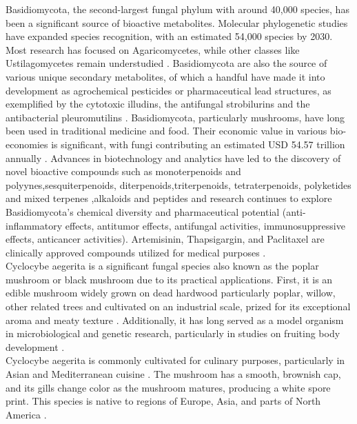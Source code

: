 Basidiomycota, the second-largest fungal phylum with around 40,000 species, has been a significant source of bioactive metabolites. Molecular phylogenetic studies have expanded species recognition, with an estimated 54,000 species by 2030. Most research has focused on Agaricomycetes, while other classes like Ustilagomycetes remain understudied \cite{He2019-time}. Basidiomycota are also the source of various unique secondary metabolites, of which a handful have made it into development as agrochemical pesticides or pharmaceutical lead structures, as exemplified by the cytotoxic illudins, the antifungal strobilurins and the antibacterial pleuromutilins \cite{He2019-time}. Basidiomycota, particularly mushrooms, have long been used in traditional medicine and food. Their economic value in various bio-economies is significant, with fungi contributing an estimated USD 54.57 trillion annually \cite{Sum2023-vinni}. Advances in biotechnology and analytics have led to the discovery of novel bioactive compounds such as monoterpenoids and polyynes,sesquiterpenoids, diterpenoids,triterpenoids, tetraterpenoids, polyketides and mixed terpenes ,alkaloids and peptides and research continues to explore Basidiomycota's chemical diversity and pharmaceutical potential (anti-inflammatory effects, antitumor effects, antifungal activities, immunosuppressive effects, anticancer activities). Artemisinin, Thapsigargin, and Paclitaxel are clinically approved compounds utilized for medical purposes \cite{Bergman2019}.\\

Cyclocybe aegerita is a significant fungal species also known as the poplar mushroom or black mushroom due to its practical applications. First, it is an edible mushroom widely  grown on dead hardwood particularly poplar, willow, other related trees and  cultivated on an industrial scale, prized for its exceptional aroma and meaty texture \cite{Surup2019}. Additionally, it has long served as a model organism in microbiological and genetic research, particularly in studies on fruiting body development \cite{Surup2019}.\\


Cyclocybe aegerita is commonly cultivated for culinary purposes, particularly in Asian and Mediterranean cuisine \cite{wikipedia}. The mushroom has a smooth, brownish cap, and its gills change color as the mushroom matures, producing a white spore print. This species is native to regions of Europe, Asia, and parts of North America \cite{wikipedia}.\\

